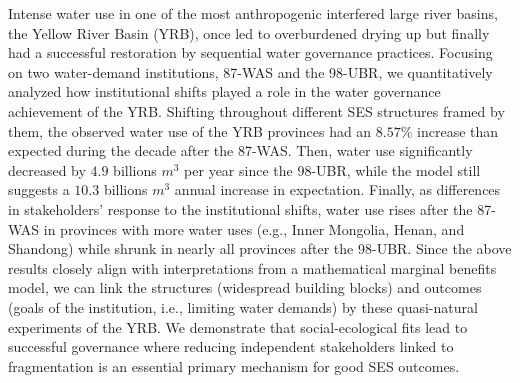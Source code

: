 
Intense water use in one of the most anthropogenic interfered large river basins, the Yellow River Basin (YRB), once led to overburdened drying up but finally had a successful restoration by sequential water governance practices.
Focusing on two water-demand institutions, 87-WAS and the 98-UBR, we quantitatively analyzed how institutional shifts played a role in the water governance achievement of the YRB.
Shifting throughout different SES structures framed by them, the observed water use of the YRB provinces had an $8.57\%$ increase than expected during the decade after the 87-WAS.
Then, water use significantly decreased by  $4.9$ billions $m^3$ per year since the 98-UBR, while the model still suggests a $10.3$ billions $m^3$ annual increase in expectation.
Finally, as differences in stakeholders' response to the institutional shifts, water use rises after the 87-WAS in provinces with more water uses (e.g., Inner Mongolia, Henan, and Shandong) while shrunk in nearly all provinces after the 98-UBR.
Since the above results closely align with interpretations from a mathematical marginal benefits model, we can link the structures (widespread building blocks) and outcomes (goals of the institution, i.e., limiting water demands) by these quasi-natural experiments of the YRB.
We demonstrate that social-ecological fits lead to successful governance where reducing independent stakeholders linked to fragmentation is an essential primary mechanism for good SES outcomes.

